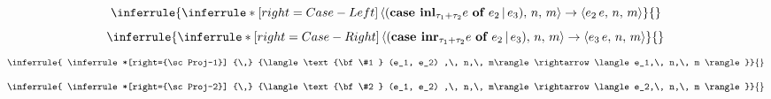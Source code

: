 \documentclass{article}
\begin{document}
\begin{multicols}{2}
				\begin{equation*}
				\inferrule{
				\inferrule*[right={\sc Case-Left}]
				{\,}
				{\langle (\text{\bf case } {\bf inl}_{\tau_1 + \tau_2} e \text{ \bf of } e_2 \,|\, e_3) ,\, n,\, m\rangle \rightarrow \langle e_2\, e,\, n,\, m \rangle}}
				{}
			\end{equation*}
				\begin{equation*}
				\inferrule{
				\inferrule*[right={\sc Case-Right}]
				{\,}
				{\langle (\text{\bf case } {\bf inr}_{\tau_1 + \tau_2} e \text{ \bf of } e_2 \,|\, e_3) ,\, n,\, m\rangle \rightarrow \langle e_3\, e,\, n,\, m \rangle}}
				{}
			\end{equation*}
				\begin{equation*}
				\inferrule{
				\inferrule*[right={\sc Proj-1}]
				{\,}
				{\langle \text{\bf \#1 } (e_1, e_2) ,\, n,\, m\rangle \rightarrow \langle e_1,\, n,\, m \rangle}}
				{}
			\end{equation*}
				\begin{equation*}
				\inferrule{
				\inferrule*[right={\sc Proj-2}]
				{\,}
				{\langle \text{\bf \#2 } (e_1, e_2) ,\, n,\, m\rangle \rightarrow \langle e_2,\, n,\, m \rangle}}
				{}
			\end{equation*}
		\end{multicols}
\end{document}
